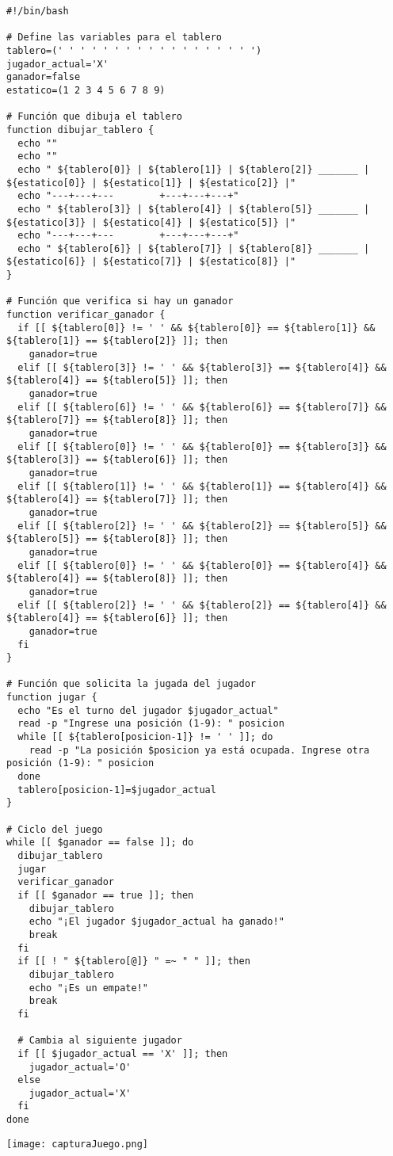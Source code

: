 \documentclass{article}
\begin{document}
\begin{verbatim}
#!/bin/bash

# Define las variables para el tablero
tablero=(' ' ' ' ' ' ' ' ' ' ' ' ' ' ' ' ' ')
jugador_actual='X'
ganador=false
estatico=(1 2 3 4 5 6 7 8 9)

# Función que dibuja el tablero
function dibujar_tablero {
  echo ""
  echo ""
  echo " ${tablero[0]} | ${tablero[1]} | ${tablero[2]} _______ | ${estatico[0]} | ${estatico[1]} | ${estatico[2]} |"
  echo "---+---+---        +---+---+---+"
  echo " ${tablero[3]} | ${tablero[4]} | ${tablero[5]} _______ | ${estatico[3]} | ${estatico[4]} | ${estatico[5]} |"
  echo "---+---+---        +---+---+---+"
  echo " ${tablero[6]} | ${tablero[7]} | ${tablero[8]} _______ | ${estatico[6]} | ${estatico[7]} | ${estatico[8]} |"
}

# Función que verifica si hay un ganador
function verificar_ganador {
  if [[ ${tablero[0]} != ' ' && ${tablero[0]} == ${tablero[1]} && ${tablero[1]} == ${tablero[2]} ]]; then
    ganador=true
  elif [[ ${tablero[3]} != ' ' && ${tablero[3]} == ${tablero[4]} && ${tablero[4]} == ${tablero[5]} ]]; then
    ganador=true
  elif [[ ${tablero[6]} != ' ' && ${tablero[6]} == ${tablero[7]} && ${tablero[7]} == ${tablero[8]} ]]; then
    ganador=true
  elif [[ ${tablero[0]} != ' ' && ${tablero[0]} == ${tablero[3]} && ${tablero[3]} == ${tablero[6]} ]]; then
    ganador=true
  elif [[ ${tablero[1]} != ' ' && ${tablero[1]} == ${tablero[4]} && ${tablero[4]} == ${tablero[7]} ]]; then
    ganador=true
  elif [[ ${tablero[2]} != ' ' && ${tablero[2]} == ${tablero[5]} && ${tablero[5]} == ${tablero[8]} ]]; then
    ganador=true
  elif [[ ${tablero[0]} != ' ' && ${tablero[0]} == ${tablero[4]} && ${tablero[4]} == ${tablero[8]} ]]; then
    ganador=true
  elif [[ ${tablero[2]} != ' ' && ${tablero[2]} == ${tablero[4]} && ${tablero[4]} == ${tablero[6]} ]]; then
    ganador=true
  fi
}

# Función que solicita la jugada del jugador
function jugar {
  echo "Es el turno del jugador $jugador_actual"
  read -p "Ingrese una posición (1-9): " posicion
  while [[ ${tablero[posicion-1]} != ' ' ]]; do
    read -p "La posición $posicion ya está ocupada. Ingrese otra posición (1-9): " posicion
  done
  tablero[posicion-1]=$jugador_actual
}

# Ciclo del juego
while [[ $ganador == false ]]; do
  dibujar_tablero
  jugar
  verificar_ganador
  if [[ $ganador == true ]]; then
    dibujar_tablero
    echo "¡El jugador $jugador_actual ha ganado!"
    break
  fi
  if [[ ! " ${tablero[@]} " =~ " " ]]; then
    dibujar_tablero
    echo "¡Es un empate!"
    break
  fi

  # Cambia al siguiente jugador
  if [[ $jugador_actual == 'X' ]]; then
    jugador_actual='O'
  else
    jugador_actual='X'
  fi
done
\end{verbatim}
\begin{center}
    \texttt{[image: capturaJuego.png]}
\end{center}
\end{document}
